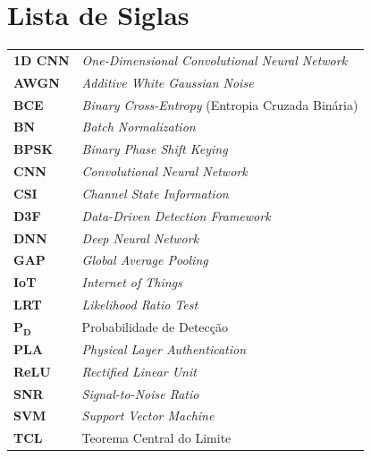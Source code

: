 \documentclass{sbrt}
\begin{document}
\section*{Lista de Siglas}
{\small
\begin{tabular}{@{}p{1.9cm}p{5.9cm}@{}}
\textbf{1D CNN}    & \textit{One-Dimensional Convolutional Neural Network} \\
\textbf{AWGN}      & \textit{Additive White Gaussian Noise} \\
\textbf{BCE}       & \textit{Binary Cross-Entropy} (Entropia Cruzada Binária) \\
\textbf{BN}        & \textit{Batch Normalization} \\
\textbf{BPSK}      & \textit{Binary Phase Shift Keying} \\
\textbf{CNN}       & \textit{Convolutional Neural Network} \\
\textbf{CSI}       & \textit{Channel State Information} \\
\textbf{D3F}       & \textit{Data-Driven Detection Framework}~\cite{ref_braca} \\
\textbf{DNN}       & \textit{Deep Neural Network} \\
\textbf{GAP}       & \textit{Global Average Pooling} \\
\textbf{IoT}       & \textit{Internet of Things} \\
\textbf{LRT}       & \textit{Likelihood Ratio Test} \\
$\boldsymbol{P_D}$ & Probabilidade de Detecção \\
\textbf{PLA}       & \textit{Physical Layer Authentication} \\
\textbf{ReLU}      & \textit{Rectified Linear Unit} \\
\textbf{SNR}       & \textit{Signal-to-Noise Ratio} \\
\textbf{SVM}       & \textit{Support Vector Machine} \\
\textbf{TCL}       & Teorema Central do Limite \\
\end{tabular}
}
\end{document}
